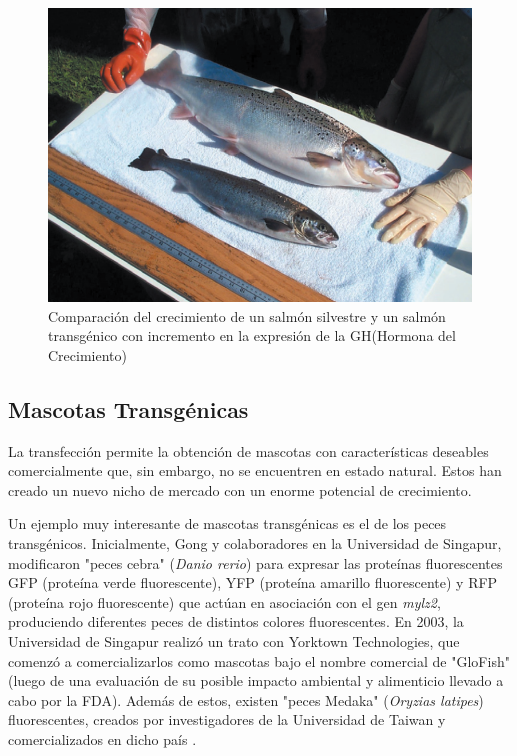 \documentclass[fleqn,10pt]{SelfArx} %
\begin{document}
\begin{figure}[ht]\centering
\includegraphics[width=\linewidth]{images/salmon}
\caption{Comparación del crecimiento de un salmón silvestre y un salmón transgénico con incremento en la expresión de la GH(Hormona del Crecimiento)\cite{berkowitz1994transgenic, ledford2013transgenic}}
\label{salmon}
\end{figure}

\subsection{Mascotas Transgénicas}
    
    La transfección permite la obtención de mascotas con características deseables comercialmente que, sin embargo, no se encuentren en estado natural. Estos han creado un nuevo nicho de mercado con un enorme potencial de crecimiento. 
    
    Un ejemplo muy interesante de mascotas transgénicas es el de los peces transgénicos. Inicialmente, Gong y colaboradores en la Universidad de Singapur, modificaron "peces cebra" (\textit{Danio rerio}) para expresar las proteínas fluorescentes GFP (proteína verde fluorescente), YFP (proteína amarillo fluorescente) y RFP (proteína rojo fluorescente) que actúan en asociación con el gen \textit{mylz2}, produciendo diferentes peces de distintos colores fluorescentes. En 2003, la Universidad de Singapur realizó un trato con Yorktown Technologies, que comenzó a comercializarlos como mascotas bajo el nombre comercial de "GloFish" (luego de una evaluación de su posible impacto ambiental y alimenticio llevado a cabo por la FDA)\cite{food2003fda}. Además de estos, existen "peces Medaka" (\textit{Oryzias latipes}) fluorescentes, creados por investigadores de la Universidad de Taiwan y comercializados en dicho país \cite{gong2003development, espinoza2012reproduccion, scotto2013primera}.
    
\end{document}
